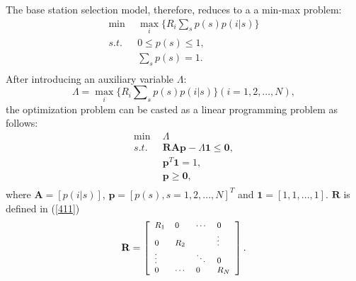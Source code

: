 \documentclass[journal,12pt,draftclsnofoot,onecolumn]{IEEEtran}
\begin{document}

The base station selection model, therefore, reduces to a a min-max problem:
\begin{equation}\label{39}
\begin{aligned}
\min \ \  & {{\max }_{i}}\{{{R}_{i}}\sum\nolimits_{s}{p(s)p(i|s)}\} \\
s.t. \ \ & 0\le p(s)\le 1, \\
 & \sum\limits_{s}{p(s)=1.} \\
\end{aligned}
\end{equation}
After introducing an auxiliary variable $\Lambda$:
\begin{equation}\label{40}
\Lambda ={{\max }_{i}}\{{{R}_{i}}\sum\nolimits_{s}{p(s)p(i|s)}\}(i=1,2,...,N),
\end{equation}
the optimization problem can be casted as a linear programming problem as follows:
\begin{equation}\label{41}
\begin{aligned}
\min \ \   & \Lambda  \\
s.t. \ \  & \mathbf{RAp}-\Lambda \mathbf{1}\le \mathbf{0}, \\
 & {{\mathbf{p}}^{T}}\mathbf{1}=1, \\
 & \mathbf{p}\ge \mathbf{0}, \\
\end{aligned}
\end{equation}
where $\mathbf{A}=[p(i|s)]$, $\mathbf{p}=[p(s),s=1,2,...,N]^{T}$ and $\mathbf{1}=[1,1,...,1]$.
$\mathbf{R}$ is defined in (\ref{411})
\begin{equation}\label{411}
\footnotesize
\mathbf{R}=\left[ \begin{array}{*{35}{l}}
   {{R}_{1}} & 0 & \cdots  & 0  \\
   0 & {{R}_{2}} & {} & \vdots   \\
   \vdots  & {} & \ddots  & 0  \\
   0 & \cdots  & 0 & {{R}_{N}}  \\
\end{array} \right].
\end{equation}
\end{document}

